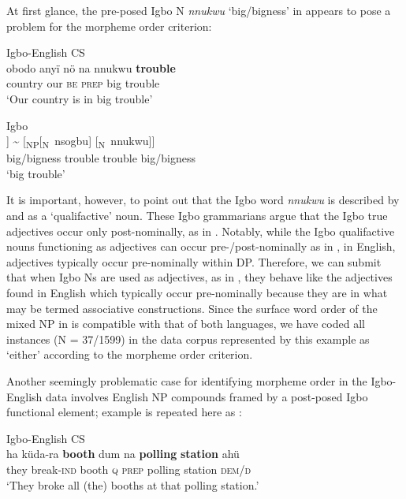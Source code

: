 \documentclass[output=paper]{langsci/langscibook}
\begin{document}
At first glance, the pre-posed Igbo N \textit{nnukwu} ‘big/bigness’ in  appears to pose a problem for the morpheme order criterion:

\ea\label{ex:ihemere:12}
\ea\label{ex:ihemere:12a} Igbo-English CS\\
\gll obodo  anyï  nö    na  nnukwu  \textbf{trouble}\\
     country  our    \textsc{be}  \textsc{prep} big     trouble\\
\glt ‘Our country is in big trouble’

\ex\label{ex:ihemere:12b} Igbo \\
\gll [\textsubscript{NP}[\textsubscript{N}~nnukwu]  [\textsubscript{N}~nsogbu]] {\textasciitilde} [\textsubscript{NP}[\textsubscript{N}~nsogbu] [\textsubscript{N}~nnukwu]]  \\
	    {\hphantom{[\textsubscript{NP}[\textsubscript{N}~}}big/bigness  {\hphantom{[\textsubscript{N}~}}trouble   {}                {\hphantom{[\textsubscript{NP}[\textsubscript{N}~}}trouble       {\hphantom{[\textsubscript{N}~}}big/bigness    \\
\glt ‘big trouble’
\z
\z

It is important, however, to point out that the Igbo word \textit{nnukwu} is described by \citet[47-8]{Emenanjo1978} and \citet[237]{MadukaDurunze1990} as a ‘qualifactive’ noun. These Igbo grammarians argue that the Igbo true adjectives occur only post-nominally, as in . Notably, while the Igbo qualifactive nouns functioning as adjectives can occur pre-/post-nominally as in , in English, adjectives typically occur pre-nominally within DP. Therefore, we can submit that when Igbo Ns are used as adjectives, as in , they behave like the adjectives found in English which typically occur pre-nominally because they are in what may be termed associative constructions. Since the surface word order of the mixed NP in  is compatible with that of both languages, we have coded all instances (N = 37/1599) in the data corpus represented by this example as ‘either’ according to the morpheme order criterion. 

Another seemingly problematic case for identifying morpheme order in the Igbo-English data involves English NP compounds framed by a post-posed Igbo functional element; example  is repeated here as :

\ea\label{ex:ihemere:13}
{Igbo-English CS}\\
\gll ha    küda-ra  \textbf{booth} dum   na    \textbf{polling} \textbf{station} ahü\\
     they break-\textsc{ind}  booth  \textsc{q}  \textsc{prep}  polling station   \textsc{dem/d}\\
\glt ‘They broke all (the) booths at that polling station.’   
\z
\end{document}
